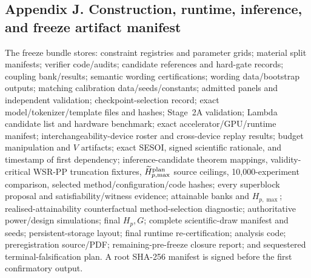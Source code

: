 \documentclass[11pt,a4paper]{article}
\begin{document}
\subsection*{Appendix J. Construction, runtime, inference, and freeze artifact manifest}
The freeze bundle stores: constraint registries and parameter grids; material split manifests; verifier code/audits; candidate references and hard-gate records; coupling bank/results; semantic wording certifications; wording data/bootstrap outputs; matching calibration data/seeds/constants; admitted panels and independent validation; checkpoint-selection record; exact model/tokenizer/template files and hashes; Stage~2A validation; Lambda candidate list and hardware benchmark; exact accelerator/GPU/runtime manifest; interchangeability-device roster and cross-device replay results; budget manipulation and $V$ artifacts; exact SESOI, signed scientific rationale, and timestamp of first dependency; inference-candidate theorem mappings, validity-critical WSR-PP truncation fixtures, $\widetilde H_{p,\max}^{\rm plan}$ source ceilings, 10,000-experiment comparison, selected method/configuration/code hashes; every superblock proposal and satisfiability/witness evidence; attainable banks and $H_{p,\max}$; realised-attainability counterfactual method-selection diagnostic; authoritative power/design simulations; final $H_p,G$; complete scientific-draw manifest and seeds; persistent-storage layout; final runtime re-certification; analysis code; preregistration source/PDF; remaining-pre-freeze closure report; and sequestered terminal-falsification plan. A root SHA-256 manifest is signed before the first confirmatory output.
\end{document}
